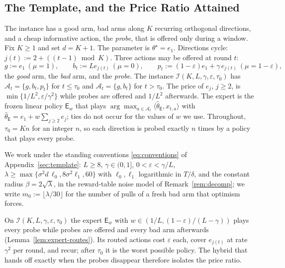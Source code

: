\documentclass[anon]{alt2027} %
\newcommand{\eps}{\varepsilon}
\newcommand{\Exp}{\mathsf{E}}
\begin{document}
\subsection{The Template, and the Price Ratio Attained}
\label{app:template-thm}

The instance has a good arm, bad arms along $K$ recurring orthogonal
directions, and a cheap informative action, the \emph{probe}, that is offered
only during a window. Fix $K\ge1$ and set $d=K+1$. The parameter is $\theta^\star=e_1$. Directions
cycle: $j(t):=2+((t-1)\bmod K)$. Three actions may be offered at round $t$:
\[
g:=e_1\ (\mu=1),\qquad
b_t:=Le_{j(t)}\ (\mu=0),\qquad
p_t:=(1-\eps)e_1+\gamma\,e_{j(t)}\ (\mu=1-\eps),
\]
the \emph{good} arm, the \emph{bad} arm, and the \emph{probe}. The instance
$\mathcal I(K,L,\gamma,\eps,\tau_0)$ has $\mathcal A_t=\{g,b_t,p_t\}$ for $t\le\tau_0$
and $\mathcal A_t=\{g,b_t\}$ for $t>\tau_0$. The price of $e_j$, $j\ge2$, is
$\min\{1/L^2,\eps/\gamma^2\}$ while probes are offered and $1/L^2$ afterwards. The
expert is the frozen linear policy $\Exp_w$ that plays
$\arg\max_{a\in\mathcal A_t}\langle\widehat\theta_{\Exp},x_{t,a}\rangle$ with
$\widehat\theta_{\Exp}=e_1+w\sum_{j\ge2}e_j$; ties do not occur for the values
of $w$ we use. Throughout, $\tau_0=Kn$ for an integer $n$, so each direction is
probed exactly $n$ times by a policy that plays every probe.

We work under the standing conventions \eqref{eq:conventions} of
Appendix~\ref{sec:template}: $L\ge8$, $\gamma\in(0,1]$, $0<\eps<\gamma/L$,
$\lambda\ge\max\{\sigma^2d\,\ell_0,8\sigma^2\ell_1,60\}$ with $\ell_0,\ell_1$
logarithmic in $T/\delta$, and the constant radius $\beta=2\sqrt\lambda$, in
the reward-table noise model of Remark~\ref{rem:decomp}; we write
$m_0:=\lfloor\lambda/30\rfloor$ for the number of pulls of a fresh bad arm
that optimism forces.

On $\mathcal I(K,L,\gamma,\eps,\tau_0)$ the expert $\Exp_w$ with
$w\in(1/L,(1-\eps)/(L-\gamma))$ plays every probe while probes are offered and
every bad arm afterwards (Lemma~\ref{lem:expert-routes}). Its routed actions
cost $\eps$ each, cover $e_{j(t)}$ at rate $\gamma^2$ per round, and recur; after
$\tau_0$ it is the worst possible policy. The hybrid that hands off exactly
when the probes disappear therefore isolates the price ratio.
\end{document}
